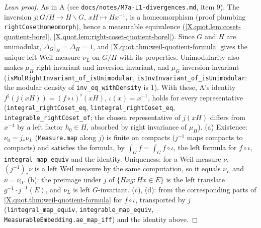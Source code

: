\begin{proof}[Lean proof]
As in A (see \texttt{docs/notes/M7a-L1-divergences.md}, item 9). The inversion $j\colon G/H\to H\backslash G$, $xH\mapsto Hx^{-1}$, is a homeomorphism (proof plumbing \texttt{rightCosetHomeomorph}), hence a measurable equivalence (\cref{X.quot.lem:coset-quotient-borel}, \cref{X.quot.lem:right-coset-quotient-borel}). Since $G$ and $H$ are unimodular, $\Delta_G|_H=\Delta_H=1$, and \cref{X.quot.thm:weil-quotient-formula} gives the unique left Weil measure $\nu_L$ on $G/H$ with its properties. Unimodularity also makes $\mu_H$ right invariant and inversion invariant, and $\mu_G$ inversion invariant (\texttt{isMulRightInvariant\_of\_isUnimodular}, \texttt{isInvInvariant\_of\_isUnimodular}: the modular density of \texttt{inv\_eq\_withDensity} is $1$). With these, A's identity $f^\natural(j(xH))=(f\circ\iota)^\flat(xH)$, $\iota(x)=x^{-1}$, holds for every representative (\texttt{integral\_rightCoset\_eq}, \texttt{lintegral\_rightCoset\_eq}, \texttt{integrable\_rightCoset\_of}; the chosen representative of $j(xH)$ differs from $x^{-1}$ by a left factor $h_0\in H$, absorbed by right invariance of $\mu_H$). (a) Existence: $\nu_0=j_*\nu_L$ (\texttt{Measure.map} along $j$) is finite on compacts ($j^{-1}$ maps compacts to compacts) and satisfies the formula, by $\int_Gf=\int_Gf\circ\iota$, the left formula for $f\circ\iota$, \texttt{integral\_map\_equiv} and the identity. Uniqueness: for a Weil measure $\nu$, $(j^{-1})_*\nu$ is a left Weil measure by the same computation, so it equals $\nu_L$ and $\nu=\nu_0$. (b): the preimage under $j$ of $\{Hxg:Hx\in E\}$ is the left translate $g^{-1}\cdot j^{-1}(E)$, and $\nu_L$ is left $G$-invariant. (c), (d): from the corresponding parts of \cref{X.quot.thm:weil-quotient-formula} for $f\circ\iota$, transported by $j$ (\texttt{lintegral\_map\_equiv}, \texttt{integrable\_map\_equiv}, \texttt{MeasurableEmbedding.ae\_map\_iff}) and the identity above.
\end{proof}

